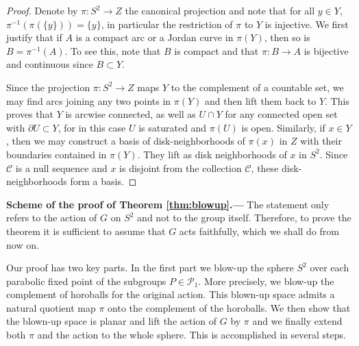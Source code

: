 \documentclass[11pt]{article}
\theoremstyle{definition}
\newcommand\CCC{\mathcal{C}}
\newcommand\PP{\mathcal{P}}
\begin{document}
\begin{proof} Denote by $\pi:S^2\to Z$ the canonical projection and note that 
for all $y\in Y$, $\pi^{-1}(\pi(\{y\}))=\{y\}$, in particular the restriction of $\pi$ to $Y$ is injective. 
We first justify that if $A$ is a compact arc or a Jordan curve in $\pi(Y)$, then so is $B=\pi^{-1}(A)$. To see this, note that $B$ is compact and that
$\pi:B\to A$ is bijective and continuous since $B\subset Y$. 

Since the projection $\pi:S^2\to Z$ maps $Y$ to the complement of a countable set,
we may find arcs joining
any two points in $\pi(Y)$ and then lift them back to $Y$. This proves that $Y$ is arcwise connected,  as well as $U\cap Y$ for any connected open 
set with $\partial U\subset Y$, for in this case $U$ is saturated and $\pi(U)$ is open.
Similarly, if $x\in Y$, then we may construct a basis of disk-neighborhoods of $\pi(x)$ in $Z$ with their boundaries contained in $\pi(Y)$. 
They lift as disk neighborhoods of $x$ in $S^2$. Since $\CCC$ is a null sequence and $x$ is disjoint from the collection $\CCC$, these disk-neighborhoods  form a basis. \end{proof}


{\noindent\bf Scheme of the proof of Theorem \ref{thm:blowup}.---}
The statement only refers to the action of $G$ on $S^2$ and not to the group itself. Therefore,  to prove the theorem it is sufficient to assume that $G$ acts faithfully, which we shall do from now on.



Our proof has two key parts. In the first part we blow-up the sphere $S^2$ over each parabolic fixed point of the subgroups $P\in\PP_1$. More precisely, we blow-up the complement of horoballs for the original action. This blown-up space admits a natural quotient map $\pi$ onto the complement of the horoballs. We then show that the blown-up space is planar and lift the action of $G$ by $\pi$ and we finally extend both $\pi$ and the action to the whole sphere. This is accomplished in several steps.

\medskip
\end{document}
